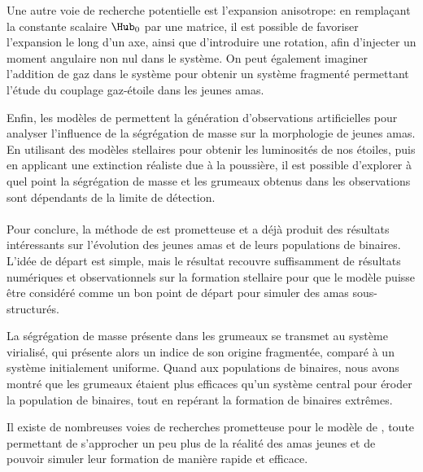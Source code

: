 Une autre voie de recherche potentielle est l'expansion anisotrope: en remplaçant la constante scalaire $\Hub_0$ par une matrice, il est possible de favoriser l'expansion le long d'un axe, ainsi que d'introduire une rotation, afin d'injecter un moment angulaire non nul dans le système. On peut également imaginer l'addition de gaz dans le système pour obtenir un système fragmenté permettant l'étude du couplage gaz-étoile dans les jeunes amas.

Enfin, les modèles de \HubLem permettent la génération d'observations artificielles pour analyser l'influence de la ségrégation de masse sur la morphologie de jeunes amas. En utilisant des modèles stellaires pour obtenir les luminosités de nos étoiles, puis en applicant une extinction réaliste due à la poussière, il est possible d'explorer à quel point la ségrégation de masse et les grumeaux obtenus dans les observations sont dépendants de la limite de détection.


\paragraph*{}
Pour conclure, la méthode de \HubLem est prometteuse et a déjà produit des résultats intéressants sur l'évolution des jeunes amas et de leurs populations de binaires. L'idée de départ est simple, mais le résultat recouvre suffisamment de résultats numériques et observationnels sur la formation stellaire pour que le modèle puisse être considéré comme un bon point de départ pour simuler des amas sous-structurés.

La ségrégation de masse présente dans les grumeaux se transmet au système virialisé, qui présente alors un indice de son origine fragmentée, comparé à un système initialement uniforme. Quand aux populations de binaires, nous avons montré que les grumeaux étaient plus efficaces qu'un système central pour éroder la population de binaires, tout en repérant la formation de binaires extrêmes.

Il existe de nombreuses voies de recherches prometteuse pour le modèle de \HubLem, toute permettant de s'approcher un peu plus de la réalité des amas jeunes et de pouvoir simuler leur formation de manière rapide et efficace.
